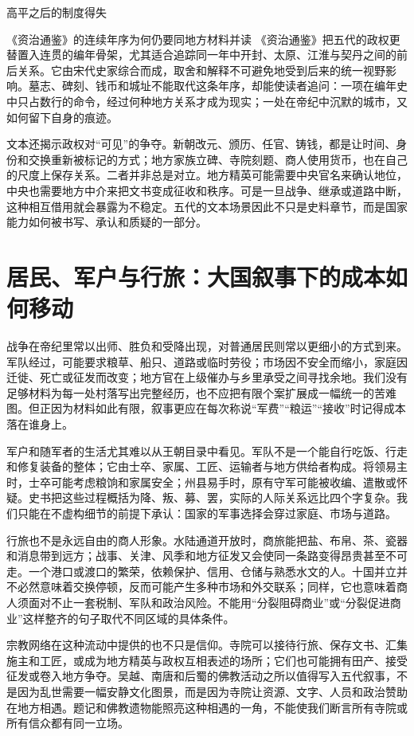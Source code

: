 \begin{causalchain}{高平之后的制度得失}
\begin{textwindow}{《资治通鉴》的连续年序为何仍要同地方材料并读}
《资治通鉴》把五代的政权更替置入连贯的编年骨架，尤其适合追踪同一年中开封、太原、江淮与契丹之间的前后关系。它由宋代史家综合而成，取舍和解释不可避免地受到后来的统一视野影响。墓志、碑刻、钱币和城址不能取代这条年序，却能使读者追问：一项在编年史中只占数行的命令，经过何种地方关系才成为现实；一处在帝纪中沉默的城市，又如何留下自身的痕迹。
\end{textwindow}

文本还揭示政权对“可见”的争夺。新朝改元、颁历、任官、铸钱，都是让时间、身份和交换重新被标记的方式；地方家族立碑、寺院刻题、商人使用货币，也在自己的尺度上保存关系。二者并非总是对立。地方精英可能需要中央官名来确认地位，中央也需要地方中介来把文书变成征收和秩序。可是一旦战争、继承或道路中断，这种相互借用就会暴露为不稳定。五代的文本场景因此不只是史料章节，而是国家能力如何被书写、承认和质疑的一部分。

\section{居民、军户与行旅：大国叙事下的成本如何移动}

战争在帝纪里常以出师、胜负和受降出现，对普通居民则常以更细小的方式到来。军队经过，可能要求粮草、船只、道路或临时劳役；市场因不安全而缩小，家庭因迁徙、死亡或征发而改变；地方官在上级催办与乡里承受之间寻找余地。我们没有足够材料为每一处村落写出完整经历，也不应把有限个案扩展成一幅统一的苦难图。但正因为材料如此有限，叙事更应在每次称说“军费”“粮运”“接收”时记得成本落在谁身上。

军户和随军者的生活尤其难以从王朝目录中看见。军队不是一个能自行吃饭、行走和修复装备的整体；它由士卒、家属、工匠、运输者与地方供给者构成。将领易主时，士卒可能考虑粮饷和家属安全；州县易手时，原有守军可能被收编、遣散或怀疑。史书把这些过程概括为降、叛、募、罢，实际的人际关系远比四个字复杂。我们只能在不虚构细节的前提下承认：国家的军事选择会穿过家庭、市场与道路。

行旅也不是永远自由的商人形象。水陆通道开放时，商旅能把盐、布帛、茶、瓷器和消息带到远方；战事、关津、风季和地方征发又会使同一条路变得昂贵甚至不可走。一个港口或渡口的繁荣，依赖保护、信用、仓储与熟悉水文的人。十国并立并不必然意味着交换停顿，反而可能产生多种市场和外交联系；同样，它也意味着商人须面对不止一套税制、军队和政治风险。不能用“分裂阻碍商业”或“分裂促进商业”这样整齐的句子取代不同区域的具体条件。

宗教网络在这种流动中提供的也不只是信仰。寺院可以接待行旅、保存文书、汇集施主和工匠，或成为地方精英与政权互相表述的场所；它们也可能拥有田产、接受征发或卷入地方争夺。吴越、南唐和后蜀的佛教活动之所以值得写入五代叙事，不是因为乱世需要一幅安静文化图景，而是因为寺院让资源、文字、人员和政治赞助在地方相遇。题记和佛教遗物能照亮这种相遇的一角，不能使我们断言所有寺院或所有信众都有同一立场。


\end{causalchain}
